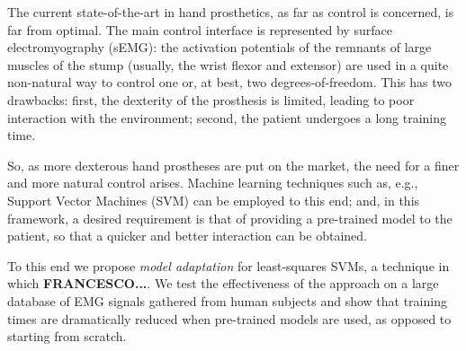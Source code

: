 The current state-of-the-art in hand prosthetics, as far as control is
concerned, is far from optimal. The main control interface is
represented by surface electromyography (sEMG): the activation
potentials of the remnants of large muscles of the stump (usually, the
wrist flexor and extensor) are used in a quite non-natural way to
control one or, at best, two degrees-of-freedom. This has two
drawbacks: first, the dexterity of the prosthesis is limited, leading
to poor interaction with the environment; second, the patient
undergoes a long training time.

So, as more dexterous hand prostheses are put on the market, the need
for a finer and more natural control arises. Machine learning
techniques such as, e.g., Support Vector Machines (SVM) can be
employed to this end; and, in this framework, a desired requirement is
that of providing a pre-trained model to the patient, so that a
quicker and better interaction can be obtained.

To this end we propose \emph{model adaptation} for least-squares SVMs,
a technique in which \textbf{FRANCESCO...}. We test the effectiveness
of the approach on a large database of EMG signals gathered from human
subjects and show that training times are dramatically reduced when
pre-trained models are used, as opposed to starting from scratch.
